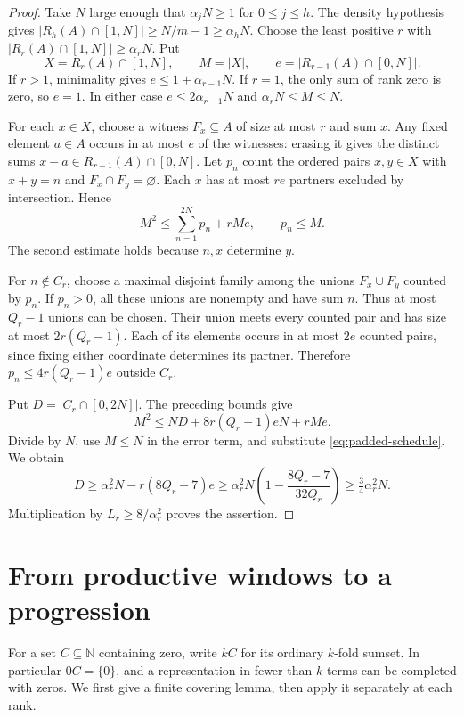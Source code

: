 \documentclass[11pt,reqno]{amsart}
\theoremstyle{definition}
\theoremstyle{remark}
\begin{document}
\begin{proof}
Take \(N\) large enough that \(\alpha_j N\ge1\) for \(0\le j\le h\).
The density hypothesis gives
\(|R_h(A)\cap[1,N]|\ge N/m-1\ge\alpha_h N\).
Choose the least positive \(r\) with
\(|R_r(A)\cap[1,N]|\ge\alpha_r N\). Put
\[
 X=R_r(A)\cap[1,N],\qquad M=|X|,\qquad
 e=|R_{r-1}(A)\cap[0,N]|.
\]
If \(r>1\), minimality gives \(e\le 1+\alpha_{r-1}N\).
If \(r=1\), the only sum of rank zero is zero, so \(e=1\).
In either case \(e\le2\alpha_{r-1}N\) and \(\alpha_r N\le M\le N\).

For each \(x\in X\), choose a witness \(F_x\subseteq A\) of size
at most \(r\) and sum \(x\). Any fixed element \(a\in A\) occurs in at
most \(e\) of the witnesses: erasing it gives the distinct sums
\(x-a\in R_{r-1}(A)\cap[0,N]\).
Let \(p_n\) count the ordered pairs \(x,y\in X\) with \(x+y=n\)
and \(F_x\cap F_y=\varnothing\). Each \(x\) has at most \(re\)
partners excluded by intersection. Hence
\[
 M^2\le \sum_{n=1}^{2N}p_n+rMe,\qquad p_n\le M .
\]
The second estimate holds because \(n,x\) determine \(y\).

For \(n\notin C_r\), choose a maximal disjoint family among the unions
\(F_x\cup F_y\) counted by \(p_n\). If \(p_n>0\), all these unions
are nonempty and have sum \(n\). Thus at most \(Q_r-1\) unions can be
chosen. Their union meets every counted pair and has size at most
\(2r(Q_r-1)\). Each of its elements occurs in at most \(2e\) counted
pairs, since fixing either coordinate determines its partner. Therefore
\(p_n\le4r(Q_r-1)e\) outside \(C_r\).

Put \(D=|C_r\cap[0,2N]|\). The preceding bounds give
\[
 M^2\le ND+8r(Q_r-1)eN+rMe.
\]
Divide by \(N\), use \(M\le N\) in the error term, and substitute
\eqref{eq:padded-schedule}. We obtain
\[
 D\ge\alpha_r^2N-r(8Q_r-7)e
 \ge\alpha_r^2N\left(1-\frac{8Q_r-7}{32Q_r}\right)
 \ge\tfrac34\alpha_r^2N.
\]
Multiplication by \(L_r\ge8/\alpha_r^2\) proves the assertion.
\end{proof}

\section{From productive windows to a progression}
\label{sec:adjacent}

For a set \(C\subseteq\mathbb N\) containing zero, write \(kC\) for its
ordinary \(k\)-fold sumset. In particular \(0C=\{0\}\), and a
representation in fewer than \(k\) terms can be completed with zeros.
We first give a finite covering lemma, then apply it separately at each rank.
\end{document}
